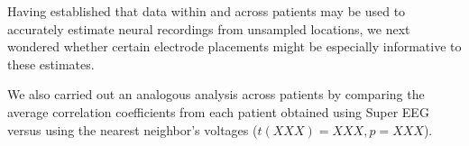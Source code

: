 Having established that data within and across patients may be used to
accurately estimate neural recordings from unsampled locations, we
next wondered whether certain electrode placements might be especially
informative to these estimates.

We also carried out an analogous analysis
across patients by comparing the average correlation coefficients from
each patient obtained using Super EEG versus using the nearest
neighbor's voltages ($t(XXX) = XXX, p = XXX$).  













